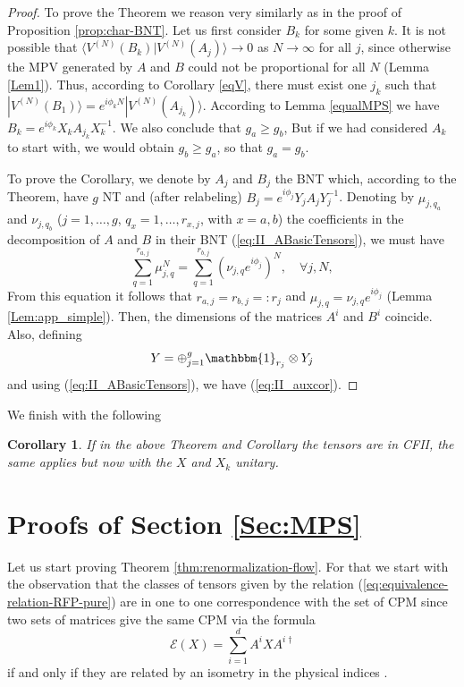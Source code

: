 \documentclass{elsarticle}
\newcommand{\Id}{\mathbbm{1}}
\newcommand{\be}{\begin{equation}}
\newcommand{\ee}{\end{equation}}
\newtheorem{cor}[thm]{Corollary}
\begin{document}
\begin{proof}
    To prove the Theorem we reason very similarly as in the proof of Proposition \ref{prop:char-BNT}. Let us first consider $B_k$ for some given $k$. It is not possible that $\langle V^{(N)}(B_k)|V^{(N)}(A_j)\rangle\to 0$ as $N\to\infty$ for all $j$, since otherwise the MPV generated by $A$ and $B$ could not be proportional for all $N$ (Lemma \ref{Lem1}). Thus, according to Corollary \ref{eqV}, there must exist one $j_k$ such that $|V^{(N)}(B_1)\rangle =e^{i\phi_k N} |V^{(N)}(A_{j_k})\rangle$. According to Lemma \ref{equalMPS} we have $B_k = e^{i\phi_k} X_k A_{j_k} X_k^{-1}$. We also conclude that $g_a\ge g_b$, But if we had considered $A_k$ to start with, we would obtain $g_b\ge g_a$, so that $g_a=g_b$.

    To prove the Corollary, we denote by $A_j$ and $B_j$ the BNT which, according to the Theorem, have $g$ NT and (after relabeling) $B_j = e^{i\phi_j} Y_j A_{j} Y_j^{-1}$. Denoting by $\mu_{j,q_a}$ and $\nu_{j,q_b}$ ($j=1,\ldots,g$, $q_{x} = 1,\ldots, r_{x,j}$, with $x=a,b$) the coefficients in the decomposition of $A$ and $B$ in their BNT (\ref{eq:II_ABasicTensors}), we must have
    \be
        \sum_{q=1}^{r_{a,j}} \mu_{j,q}^N = \sum_{q=1}^{r_{b,j}} (\nu_{j,q}e^{i\phi_j})^N, \quad \forall j,N,
    \ee
    From this equation it follows that $r_{a,j}=r_{b,j}=:r_j$ and $\mu_{j,q}=\nu_{j,q}e^{i\phi_j}$  (Lemma \ref{Lem:app_simple}). Then, the dimensions of the matrices $A^i$ and $B^i$ coincide. Also, defining
    \be
        Y= \oplus_{j=1}^{g} \Id_{r_j}\otimes Y_j
    \ee
    and using (\ref{eq:II_ABasicTensors}), we have (\ref{eq:II_auxcor}).
\end{proof}

We finish with the following

\begin{cor}\label{thm:Fundamental-CFII}
    If in the above Theorem and Corollary the tensors are in CFII, the same applies but now with the $X$ and $X_k$ unitary.
\end{cor}


\section{Proofs of Section \ref{Sec:MPS}}\label{AppendixPure}

Let us start proving Theorem \ref{thm:renormalization-flow}. For that we start with the observation that the classes of tensors given by the relation (\ref{eq:equivalence-relation-RFP-pure})  are in one to one correspondence with the set of CPM since two sets of matrices give the same CPM via the formula
\be\label{eq:appendix-CPM} \mathcal{E}(X)=\sum_{i=1}^d A^i X A^{i\dagger}
\ee if and only if they are related by an  isometry in the physical indices \cite{Michael-Notes}.
\end{document}
